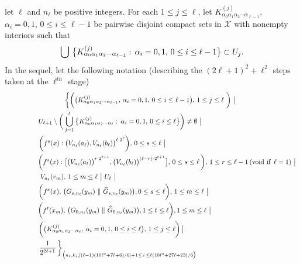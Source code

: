 \documentclass[12pt]{article}
\newcommand{\al}{\alpha}
\begin{document}
let $\ell$ and $n_\ell$ be positive integers.  For each $1 \le j \le \ell$, let $K_{\al_0\al_1\al_2\cdots \al_{\ell-1}}^{(j)}$, $\al_i = 0, 1, \, 0 \le i \le \ell-1$ be pairwise disjoint compact sets in $\mathcal X$ with nonempty interiors such that 
$$
\bigcup \, \big\{ K_{\al_0\al_1\al_2\cdots \al_{\ell-1}}^{(j)}: \, \al_i = 0, 1, \, 0 \le i \le \ell-1 \big\} \subset U_j.\vspace{.1in}
$$
\indent In the sequel, let the following notation (describing the $(2\ell+1)^2+\ell^2$ steps taken at the $\ell^{th}$ stage)
\begin{multline*}
$$
\bigg\{ \bigg( \big(K_{\al_0\al_1\al_2\cdots \al_{\ell-1}}^{(j)}, \, \al_i = 0, 1, \, 0 \le i \le \ell-1 \big), \, 1 \le j \le \ell \,\, \bigg) \,\, \big| \,\,\, \\ 
\qquad\qquad\quad U_{\ell+1} \setminus \bigg( \bigcup_{j=1}^\ell \big\{ K_{\al_0\al_1\al_2\cdots\al_{\ell}}^{(j)}: \, \al_i = 0, 1, \, 0 \le i \le \ell \big\} \bigg) \ne \emptyset \,\, \big| \quad\qquad\qquad\qquad\qquad\qquad\quad\quad\quad\,\,\, \\  
\,\, \bigg(f^s(x) : \big(V_{n_\ell}(a_\ell), V_{n_\ell}(b_\ell)\big)^{\ell \cdot 2^\ell}\bigg), \, 0 \le s \le \ell \,\, \big| \qquad\qquad\qquad\qquad\qquad\qquad\qquad\quad\, \\
\qquad\qquad\,\,\, \bigg(f^s(x) : \big[\big(V_{n_\ell}(a_\ell)\big)^{r \cdot 2^{\ell+1}}, \big(V_{n_\ell}(b_\ell)\big)^{(\ell-r) \cdot 2^{\ell+1}} \big], \, 0 \le s \le \ell \, \bigg), \, 1 \le r \le \ell-1 \, (\text{void if} \,\,\, \ell = 1) \,\, \big| \\
V_{n_\ell}(v_m), \, 1 \le m \le \ell \,\, \big| \,\, U_\ell \,\, \big|\qquad\qquad\qquad\qquad\qquad\qquad\qquad\qquad\qquad\qquad\qquad \\   \,\,\,\, \bigg(f^{s}(x), \, \big(G_{s,n_\ell}(y_m) \,\, \| \,\, \widehat G_{s,n_\ell}(y_m)\big), 0 \le s \le \ell\bigg), \, 1 \le m \le \ell \,\, \big| \qquad\qquad\qquad\qquad\quad\, \\ 
\qquad \bigg(f^t(x_m), \, \big(G_{0,n_\ell}(y_m) \,\, \| \,\, \widehat G_{0,n_\ell}(y_m)\big), 1 \le t \le \ell\bigg), 1 \le m \le \ell \,\, \big| \qquad\qquad\qquad\qquad\qquad\, \\ 
\bigg(\big(K_{\al_0\al_1\al_2\cdots \al_{\ell}}^{(j)}, \, \al_i = 0, 1, \, 0 \le i \le \ell\big), \, 1 \le j \le \ell\bigg) \, \big| \qquad\qquad\qquad\qquad\qquad\qquad\, \\ 
\qquad \frac 1{2^{2\ell+1}} \, \bigg\}_{\big(n_\ell,k_i, [(\ell-1)(10\ell^2+7\ell+6)/6]+1 \le \, i \, \le \ell(10\ell^2+27\ell+23)/6\big)}\,\,\qquad\qquad\qquad\qquad\qquad\quad\,\,\,\,\,
$$
\end{multline*}
\end{document}
